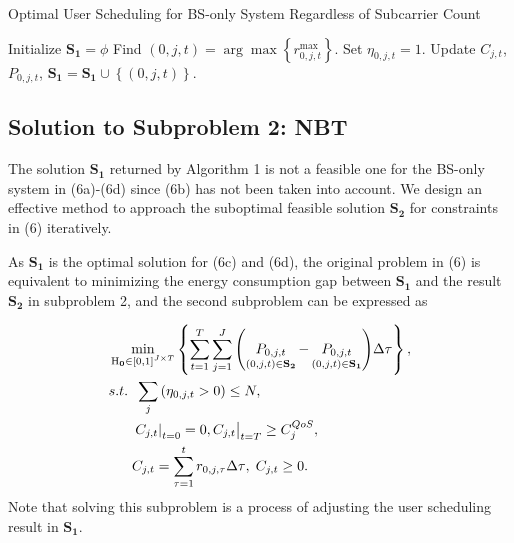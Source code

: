 \documentclass[conference]{IEEEtran}
\begin{document}
\begin{algorithm}[h]
\caption{Optimal User Scheduling for BS-only System Regardless of Subcarrier Count}
\label{alg:1}
\begin{algorithmic}[1]
\STATE Initialize ${{\mathbf{S}}_{\mathbf{1}}}=\phi$
    \STATE Find $\left( {0,j,t} \right) = \arg \max \left\{ {r_{0,j,t}^{\max }} \right\}$.
    \STATE Set ${\eta _{0,j,t}} = 1$.
    \STATE Update ${C_{j,t}}$, ${P_{0,j,t}}$, ${{\mathbf{S}}_{\mathbf{1}}}={{\mathbf{S}}_{\mathbf{1}}} \cup \left\{ {\left( {0,j,t} \right)} \right\}$.
  \ENDWHILE
\ENDFOR
\end{algorithmic}
\end{algorithm}



\subsection{Solution to \textbf{Subproblem 2: NBT}}

The solution ${{\mathbf{S}}_{\mathbf{1}}}$ returned by Algorithm 1 is not a feasible one for the BS-only system in (6a)-(6d) since (6b) has not been taken into account. We design an effective method to approach the suboptimal feasible solution ${{\mathbf{S}}_{\mathbf{2}}}$ for constraints in (6) iteratively.

As ${{\mathbf{S}}_{\mathbf{1}}}$ is the optimal solution for (6c) and (6d), the original problem in (6) is equivalent to minimizing the energy consumption gap between ${{\mathbf{S}}_{\mathbf{1}}}$ and the result ${{\mathbf{S}}_{\mathbf{2}}}$ in subproblem 2, and the second subproblem can be expressed as

\begin{subequations}
\begin{align}
& \mathop {\min }\limits_{{{\mathbf{{\rm H}}}_{\mathbf{0}}} \in {{\left[ {0,1} \right]}^{J \times T}}} \left\{ {\sum\limits_{t = 1}^T {\sum\limits_{j = 1}^J {\left( {\mathop {{P_{0,j,t}}}\limits_{\left( {0,j,t} \right) \in {{\mathbf{S}}_{\mathbf{2}}}}  - \mathop {{P_{0,j,t}}}\limits_{\left( {0,j,t} \right) \in {{\mathbf{S}}_{\mathbf{1}}}} } \right)} \Delta \tau } } \right\}, \\
& {s.t.} \;\; \sum\limits_j  {\left( {{\eta _{0,j,t}} > 0} \right)}  \le N, \\
& \;\;\;\;\;\; {\left. {{{\left. {{C_{j,t}}} \right|}_{t = 0}} = 0, {C_{j,t}}} \right|_{t = T}} \ge C_j^{QoS}, \\
& \;\;\;\;\;\; {C_{j,t}} = \sum\limits_{\tau  = 1}^t {{r_{0,j,\tau }}\Delta \tau } ,\; {C_{j,t}} \ge 0.
\end{align}
\end{subequations}
Note that solving this subproblem is a process of adjusting the user scheduling result in ${{\mathbf{S}}_{\mathbf{1}}}$.
\end{document}
